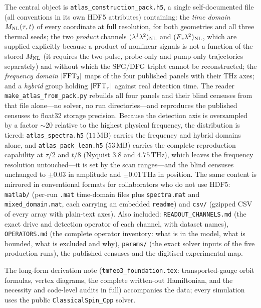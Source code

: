 \documentclass[11pt]{article}
\newcommand{\Mnl}{M_{\rm NL}}
\begin{document}
The central object is \texttt{atlas\_construction\_pack.h5}, a single
self-documented file (all conventions in its own HDF5 attributes)
containing: the \emph{time domain} $\Mnl(\tau,t)$ of every coordinate
at full resolution, for both geometries and all three thermal seeds;
the two \emph{product} channels $(\lambda^1\lambda^2)_{\rm NL}$ and
$(F_x\lambda^2)_{\rm NL}$, which are supplied explicitly because a
product of nonlinear signals is not a function of the stored $\Mnl$
(it requires the two-pulse, probe-only and pump-only trajectories
separately) and without which the SFG/DFG triplet cannot be
reconstructed; the \emph{frequency domain} $|{\rm FFT_2}|$ maps of the
four published panels with their THz axes; and a \emph{hybrid} group
holding $|{\rm FFT}_\tau|$ against real detection time.  The reader
\texttt{make\_atlas\_from\_pack.py} rebuilds all four panels and their
blind censuses from that file alone---no solver, no run
directories---and reproduces the published censuses to float32 storage
precision.  Because the detection axis is oversampled by a factor
$\sim\!20$ relative to the highest physical frequency, the
distribution is tiered: \texttt{atlas\_spectra.h5} ($11$\,MB) carries
the frequency and hybrid domains alone, and
\texttt{atlas\_pack\_lean.h5} ($53$\,MB) carries the complete
reproduction capability at $\tau/2$ and $t/8$ (Nyquist $3.8$ and
$4.75$\,THz), which leaves the frequency resolution untouched---it is
set by the scan ranges---and the blind censuses unchanged to $\pm0.03$
in amplitude and $\pm0.01$\,THz in position.  The same content is mirrored in conventional formats for
collaborators who do not use HDF5: \texttt{matlab/} (per-run
\texttt{.mat} time-domain files plus \texttt{spectra.mat} and
\texttt{mixed\_domain.mat}, each carrying an embedded \texttt{readme})
and \texttt{csv/} (gzipped CSV of every array with plain-text axes).
Also included: \texttt{READOUT\_CHANNELS.md} (the exact drive and
detection operator of each channel, with dataset names),
\texttt{OPERATORS.md} (the complete operator inventory: what is in the
model, what is bounded, what is excluded and why), \texttt{params/}
(the exact solver inputs of the five production runs), the published
censuses and the digitised experimental map.

The long-form derivation note (\texttt{tmfeo3\_foundation.tex}:
transported-gauge orbit formulas, vertex diagrams, the complete
written-out Hamiltonian, and the necessity and code-level audits in
full) accompanies the data; every simulation uses the public
\texttt{ClassicalSpin\_Cpp} solver.
\end{document}
